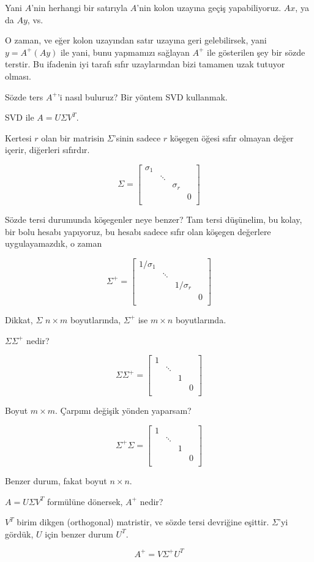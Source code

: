 \documentclass[12pt,fleqn]{article}\usepackage{../../common}
\begin{document}
Yani $A$'nin herhangi bir satırıyla $A$'nin kolon uzayına geçiş
yapabiliyoruz. $Ax$, ya da $Ay$, vs. 

O zaman, ve eğer kolon uzayından satır uzayına geri gelebilirsek, 
yani $y = A^{+}(Ay)$ ile yani, bunu yapmamızı sağlayan $A^{+}$ ile
gösterilen  şey bir sözde terstir. Bu ifadenin iyi tarafı sıfır 
uzaylarından bizi tamamen uzak tutuyor olması.

Sözde ters $A^{+}$'i nasıl buluruz? Bir yöntem SVD kullanmak.

SVD ile $A = U \Sigma V^T$. 

Kertesi $r$ olan bir matrisin $\Sigma$'sinin sadece $r$ köşegen öğesi sıfır
olmayan değer içerir, diğerleri sıfırdır.

$$ 
\Sigma = 
\left[\begin{array}{cccc}
\sigma_1 & & & \\
 & \ddots & & \\
 &  & \sigma_r & \\
 &  &  & 0 \\
\end{array}\right]
 $$

Sözde tersi durumunda köşegenler neye benzer? Tam tersi düşünelim, bu
kolay, bir bolu hesabı yapıyoruz, bu hesabı sadece sıfır olan köşegen
değerlere uygulayamazdık, o zaman

$$ 
\Sigma^{+} = 
\left[\begin{array}{cccc}
1/\sigma_1 & & & \\
 & \ddots & & \\
 &  & 1/\sigma_r & \\
 &  &  & 0 \\
\end{array}\right]
 $$

Dikkat, $\Sigma$ $n \times m$ boyutlarında, $\Sigma^{+}$ ise $m \times n$ boyutlarında. 

$\Sigma \Sigma^{+}$ nedir? 


$$ \Sigma \Sigma^{+} =  
\left[\begin{array}{cccc}
1 & & & \\
 & \ddots & & \\
 &  & 1 & \\
 &  &  & 0 \\
\end{array}\right]
$$

Boyut $m \times m$. Çarpımı değişik yönden yaparsam? 

$$ \Sigma^{+}\Sigma  =  
\left[\begin{array}{cccc}
1 & & & \\
 & \ddots & & \\
 &  & 1 & \\
 &  &  & 0 \\
\end{array}\right]
$$

Benzer durum, fakat boyut $n \times n$. 

$A = U \Sigma V^T$ formülüne dönersek, $A^{+}$ nedir? 

$V^{T}$ birim dikgen (orthogonal) matristir, ve sözde tersi devriğine
eşittir. $\Sigma$'yi gördük, $U$ için benzer durum $U^T$. 

$$ A^{+} =  V \Sigma^{+} U^T$$
\end{document}
